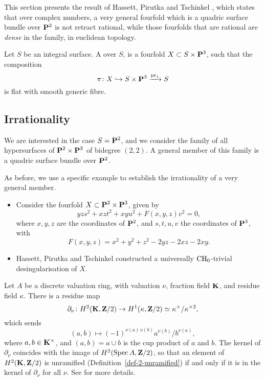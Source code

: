 This section presents the result of Hassett, Pirutka and Tschinkel \cite{hassett-pirutka-tschinkel},
which states that over complex numbers,
a very general fourfold which is a quadric surface bundle over $\bbP^2$
is not retract rational, while those fourfolds that are rational are \emph{dense}
in the family, in euclidean topology.

\begin{definition}
    Let $S$ be an integral surface.
    A  over $S$,
    is a fourfold $X \subset S \times \bbP^3$, 
    such that the composition
    \[ \pi \: X \hookrightarrow S \times \bbP^3 \xrightarrow{\mathrm{pr}_1} S \]
    is flat with smooth generic fibre.
\end{definition}

\subsection{Irrationality}

We are interested in the case $S = \bbP^2$,
and we consider the family of 
all hypersurfaces of $\bbP^2 \times \bbP^3$ of bidegree $(2,2)$.
A general member of this family is a quadric surface bundle over $\bbP^2$.

As before, we use a specific example to establish the irrationality of a very general member.

\begin{itemize}
    \item 
        Consider the fourfold $X \subset \bbP^2 \times \bbP^3$, given by
        \[ yzs^2 + xzt^2 + xyu^2 + F(x,y,z)v^2 = 0, \]
        where $x,y,z$ are the coordinates of $\bbP^2$, and $s,t,u,v$ the coordinates of $\bbP^3$, with
        \[ F(x,y,z) = x^2 + y^2 + z^2 - 2yz - 2xz - 2xy. \]
    \item
        Hassett, Pirutka and Tschinkel \cite[\S5]{hassett-pirutka-tschinkel}
        constructed a universally $\mathrm{CH}_0$-trivial desingularisation of $X$.
\end{itemize}

Let $A$ be a discrete valuation ring, with valuation $\nu$,
fraction field $\bbK$, and residue field $\kappa$.
There is a residue map
\[ \partial_{\nu} \: H^2 (\bbK, \bbZ/2) \to H^1 (\kappa, \bbZ/2) \simeq \kappa^\times / \kappa^{\times 2}, \]
which sends
\[ (a,b) \mapsto (-1)^{\nu(a)\,\nu(b)} a^{\nu(b)} / b^{\nu(a)}, \]
where $a,b \in \bbK^\times$, and $(a,b) = a \cup b$ is the cup product of $a$ and $b$.
The kernel of $\partial_{\nu}$ coincides with the image of $H^2 (\Spec A, \bbZ/2)$, 
so that an element of $H^2 (\bbK, \bbZ/2)$ is unramified (Definition~\ref{def-2-unramified})
if and only if it is in the kernel of $\partial_{\nu}$ for all $\nu$.
See \cite{colliot-unramified} for more details.

